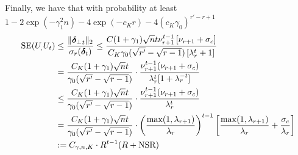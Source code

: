 \documentclass[10pt]{article}
\newcommand{\nsrmax}{\text{NSR}}
\newcommand{\SE}{\mathrm{SE}}
\begin{document}
Finally, we have that with probability at least $1 - 2 \exp(- \gamma_1^2 n) - 4 \exp(-c_Kr) - 4 (c_K \gamma_0)^{r'-r+1}$  
\begin{align*}
\SE(U_,U_t) &\leq \frac{\|\utsin_t\|_2}{\sigma_r(\utcos_t)} \leq \frac{C (1+ \gamma_1) \sqrt{n} t \nu_{r+1}^{t-1} \left[\nu_{r+1} +  \sigma_c\right]}{C_K \gamma_0(\sqrt{r'} - \sqrt{r-1}) \left[ \lambda_r^t + 1 \right]} \\
&= \frac{C_K (1+ \gamma_1) \sqrt{n} t}{\gamma_0 (\sqrt{r'} - \sqrt{r-1})} \cdot \frac{ \nu_{r+1}^{t-1} (\nu_{r+1} +  \sigma_c )}{\lambda_r^t[ 1 + \lambda_r^{-t}]} \\
&\leq \frac{C_K (1+ \gamma_1) \sqrt{n} t}{\gamma_0 (\sqrt{r'} - \sqrt{r-1})} \cdot \frac{ \nu_{r+1}^{t-1} (\nu_{r+1} +  \sigma_c )}{\lambda_r^t} \\
& = \frac{C_K (1+ \gamma_1) \sqrt{n} t}{\gamma_0 (\sqrt{r'} - \sqrt{r-1})} \cdot \left(\frac{\max(1, \lambda_{r+1})}{\lambda_r}\right)^{t-1} \left[ \frac{\max(1, \lambda_{r+1})}{\lambda_r} + \frac{\sigma_c}{\lambda_r}   \right]  \\
&:= C_{\gamma, n, K} \cdot R^{t-1} (R + \nsrmax)  
\end{align*}


\end{document}
